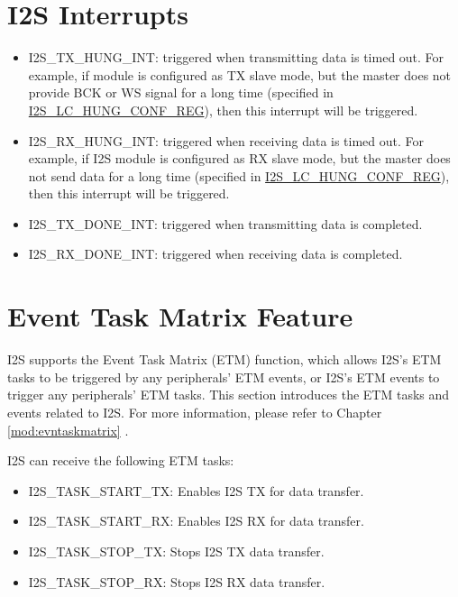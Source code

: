 \documentclass[main\_\_EN.tex]{subfiles}
\begin{document}
\section{I2S Interrupts} \label{sec:i2s-interrupts}

\begin{itemize}
\item \label{int:I2STXHUNGINT}I2S\_TX\_HUNG\_INT: triggered when transmitting data is timed out. For example, if module is configured as TX slave mode, but the master does not provide BCK or WS signal for a long time (specified in \hyperref[regdesc:I2SLCHUNGCONFREG]{I2S\_LC\_HUNG\_CONF\_REG}), then this interrupt will be triggered.
\item \label{int:I2SRXHUNGINT}I2S\_RX\_HUNG\_INT: triggered when receiving data is timed out. For example, if I2S module is configured as RX slave mode, but the master does not send data for a long time (specified in \hyperref[regdesc:I2SLCHUNGCONFREG]{I2S\_LC\_HUNG\_CONF\_REG}), then this interrupt will be triggered.
\item \label{int:I2STXDONEINT}I2S\_TX\_DONE\_INT: triggered when transmitting data is completed.
\item \label{int:I2SRXDONEINT}I2S\_RX\_DONE\_INT: triggered when receiving data is completed.
\end{itemize}

\section{Event Task Matrix Feature}\label{sec:i2s-etm-func}

\chipname{} I2S supports the Event Task Matrix (ETM) function, which allows I2S's ETM tasks to be triggered by any peripherals' ETM events, or I2S's ETM events to trigger any peripherals' ETM tasks. This section introduces the ETM tasks and events related to I2S. For more information, please refer to Chapter \ref{mod:evntaskmatrix} .

I2S can receive the following ETM tasks:

\begin{itemize}
    \item \label{task:I2STASKSTARTTX}I2S\_TASK\_START\_TX: Enables I2S TX for data transfer.
    \item \label{task:I2STASKSTARTRX}I2S\_TASK\_START\_RX: Enables I2S RX for data transfer.
    \item \label{task:I2STASKSTOPTX}I2S\_TASK\_STOP\_TX: Stops I2S TX data transfer.
    \item \label{task:I2STASKSTOPRX}I2S\_TASK\_STOP\_RX: Stops I2S RX data transfer.
\end{itemize}
\end{document}
